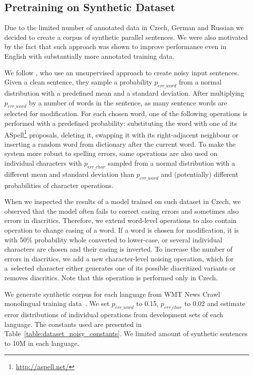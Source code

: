 \documentclass[11pt,a4paper]{article}
\begin{document}
\subsection{Pretraining on Synthetic Dataset}

Due to the limited number of annotated data in Czech, German and Russian we decided to create a corpus of synthetic parallel sentences. We were also motivated by the fact that such approach was shown to improve performance even in English with substantially more annotated training data. 

We follow , who use an unsupervised approach to create noisy input sentences. Given a clean sentence, they sample a probability $p_{err\_word}$ from a normal distribution with a predefined mean and a standard deviation. After multiplying $p_{err\_word}$ by a number of words in the sentence, as many sentence words are selected for modification. For each chosen word, one of the following operations is performed with a predefined probability: substituting the word with one of its ASpell\footnote{\scriptsize\url{http://aspell.net/}} proposals, deleting it, swapping it with its right-adjacent neighbour or inserting a random word from dictionary after the current word. To make the system more robust to spelling errors, same operations are also used on individual characters with $p_{err\_char}$ sampled from a normal distribution with a different mean and standard deviation than $p_{err\_word}$ and (potentially) different probabilities of character operations.

When we inspected the results of a model trained on such dataset in Czech, we observed that the model often fails to correct casing errors and sometimes also errors in diacritics. Therefore, we extend word-level operations to also contain operation to change casing of a word. If a word is chosen for modification, it is with 50\% probability whole converted to lower-case, or several individual characters are chosen and their casing is inverted. To increase the number of errors in diacritics, we add a new character-level noising operation, which for a~selected character either generates one of its possible diacritized variants or removes diacritics. Note that this operation is performed only in Czech.

We generate synthetic corpus for each language from WMT News Crawl monolingual training data~\cite{ondrej2017findings}. We set $p_{err\_word}$ to 0.15, $p_{err\_char}$ to 0.02 and estimate error distributions of individual operations from development sets of each language. The constants used are presented in Table~\ref{table:dataset_noisy_constants}. We limited amount of synthetic sentences to 10M in each language.
\end{document}
